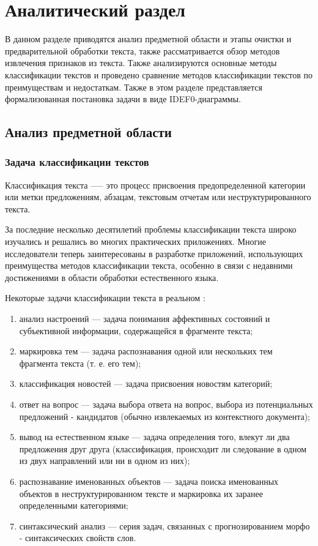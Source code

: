 \chapter{Аналитический раздел}

В данном разделе приводятся анализ предметной области и этапы очистки и предварительной обработки текста, также рассматривается обзор методов извлечения признаков из текста. Также анализируются основные методы классификации текстов и проведено сравнение методов классификации текстов по преимуществам и недостаткам. Также в этом разделе представляется формализованная постановка задачи в виде IDEF0-диаграммы.

\section{Анализ предметной области}
\subsection{Задача классификации текстов}
Классификация текста —-- это процесс присвоения предопределенной категории или метки предложениям, абзацам, текстовым отчетам или неструктурированного текста.

За последние несколько десятилетий проблемы классификации текста широко изучались и решались во многих практических приложениях. Многие исследователи теперь заинтересованы в разработке приложений, использующих преимущества методов классификации текста, особенно в связи с недавними достижениями в области обработки естественного языка.

Некоторые задачи классификации текста в реальном \cite{task}:
\begin{enumerate}
    \item анализ настроений --- задача понимания аффективных состояний и субъективной информации, содержащейся в фрагменте текста;
    \item маркировка тем --- задача распознавания одной или нескольких тем фрагмента текста (т. е. его тем);
    \item классификация новостей --- задача присвоения новостям категорий;
    \item ответ на вопрос --- задача выбора ответа на вопрос, выбора из потенциальных предложений - кандидатов (обычно извлекаемых из контекстного документа);
    \item вывод на естественном языке --- задача определения того, влекут ли два предложения друг друга (классификация, происходит ли следование в одном из двух направлений или ни в одном из них);
    \item распознавание именованных объектов --- задача поиска именованных объектов в неструктурированном тексте и маркировка их заранее определенными категориями;
    \item синтаксический анализ --- серия задач, связанных с прогнозированием морфо - синтаксических свойств слов.
\end{enumerate}
